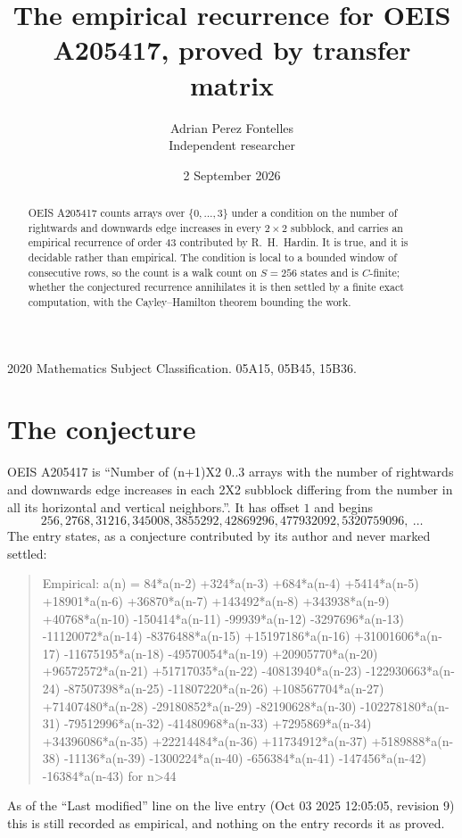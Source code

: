 \documentclass[11pt,a4paper]{article}
\title{The empirical recurrence for OEIS A205417, proved by transfer matrix}
\author{Adrian Perez Fontelles\\ \small Independent researcher}
\date{2 September 2026}
\theoremstyle{plain}
\theoremstyle{definition}
\begin{document}
\maketitle

\begin{abstract}
OEIS A205417 counts arrays over $\{0,\dots,3\}$ under a condition on the number of rightwards and downwards edge increases
in every $2\times2$ subblock, and carries an empirical recurrence of order $43$ contributed by
R.~H.~Hardin. It is true, and it is decidable rather than empirical. The condition is local to
a bounded window of consecutive rows, so the count is a walk count on $S=256$ states and is
$C$-finite; whether the conjectured recurrence annihilates it is then settled by a finite exact
computation, with the Cayley--Hamilton theorem bounding the work.
\end{abstract}

\noindent\small 2020 Mathematics Subject Classification. 05A15, 05B45, 15B36.\normalsize

\section{The conjecture}

OEIS A205417 is ``Number of (n+1)X2 0..3 arrays with the number of rightwards and downwards edge increases in each 2X2 subblock differing from the number in all its horizontal and vertical neighbors.''. It has offset $1$ and begins
\[
256, 2768, 31216, 345008, 3855292, 42869296, 477932092, 5320759096,\ \dots
\]
The entry states, as a conjecture contributed by its author and never marked settled:
\begin{quote}
Empirical: a(n) = 84*a(n-2) +324*a(n-3) +684*a(n-4) +5414*a(n-5) +18901*a(n-6) +36870*a(n-7) +143492*a(n-8) +343938*a(n-9) +40768*a(n-10) -150414*a(n-11) -99939*a(n-12) -3297696*a(n-13) -11120072*a(n-14) -8376488*a(n-15) +15197186*a(n-16) +31001606*a(n-17) -11675195*a(n-18) -49570054*a(n-19) +20905770*a(n-20) +96572572*a(n-21) +51717035*a(n-22) -40813940*a(n-23) -122930663*a(n-24) -87507398*a(n-25) -11807220*a(n-26) +108567704*a(n-27) +71407480*a(n-28) -29180852*a(n-29) -82190628*a(n-30) -102278180*a(n-31) -79512996*a(n-32) -41480968*a(n-33) +7295869*a(n-34) +34396086*a(n-35) +22214484*a(n-36) +11734912*a(n-37) +5189888*a(n-38) -11136*a(n-39) -1300224*a(n-40) -656384*a(n-41) -147456*a(n-42) -16384*a(n-43) for n>44
\end{quote}
As of the ``Last modified'' line on the live entry (Oct 03 2025 12:05:05, revision 9) this is still
recorded as empirical, and nothing on the entry records it as proved.
\end{document}
